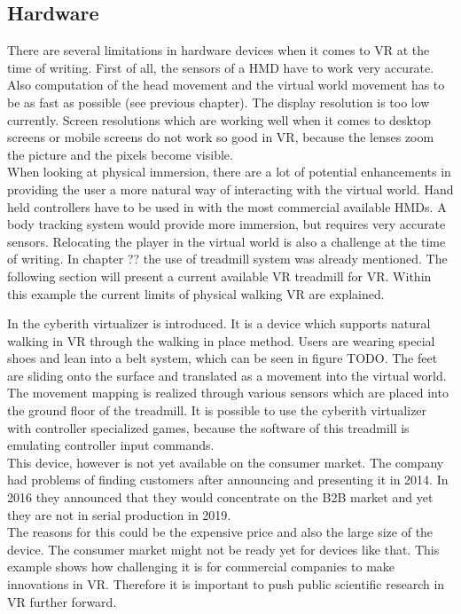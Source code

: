 \subsection{Hardware}
There are several limitations in hardware devices when it comes to VR at the time of writing. First of all, the sensors of a HMD have to work very accurate. Also computation of the head movement and the virtual world movement has to be as fast as possible (see previous chapter). The display resolution is too low currently. Screen resolutions which are working well when it comes to desktop screens or mobile screens do not work so good in VR, because the lenses zoom the picture and the pixels become visible. \\
When looking at physical immersion, there are a lot of potential enhancements in providing the user a more natural way of interacting with the virtual world. Hand held controllers have to be used in with  the most commercial available HMDs. A body tracking system would provide more immersion, but requires very accurate sensors.
Relocating the player in the virtual world is also a challenge at the time of writing. In chapter ?? the use of treadmill system was already mentioned. The following section will present a current available VR treadmill for VR. Within this example the current limits of physical walking VR are explained.

In \cite{Cakmak.2014} the cyberith virtualizer is introduced. It is a device which supports natural walking in VR through the walking in place method. Users are wearing special shoes and lean into a belt system, which can be seen in figure TODO. The feet are sliding onto the surface and translated as a movement into the virtual world. The movement mapping is realized through various sensors which are placed into the ground floor of the treadmill. It is possible to use the cyberith virtualizer with controller specialized games, because the software of this treadmill is emulating controller input commands.\\
This device, however is not yet available on the consumer market. The company had problems of finding customers after announcing and presenting it in 2014. In 2016 they announced that they would concentrate on the B2B market and yet they are not in serial production in 2019. \citep{TODO}\\
The reasons for this could be the expensive price and also the large size of the device. The consumer market might not be ready yet for devices like that. This example shows how challenging it is for commercial companies to make innovations in VR. Therefore it is important to push public scientific research in VR further forward.

